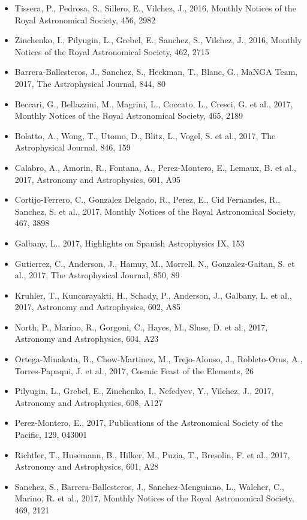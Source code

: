 \documentclass{letter}
\begin{document}
\begin{enumerate}
\begin{itemize}
\item Tissera, P., Pedrosa, S., Sillero, E., Vilchez, J., 2016, Monthly Notices of the Royal Astronomical Society, 456, 2982
\item Zinchenko, I., Pilyugin, L., Grebel, E., Sanchez, S., Vilchez, J., 2016, Monthly Notices of the Royal Astronomical Society, 462, 2715
\item Barrera-Ballesteros, J., Sanchez, S., Heckman, T., Blanc, G., MaNGA Team, 2017, The Astrophysical Journal, 844, 80
\item Beccari, G., Bellazzini, M., Magrini, L., Coccato, L., Cresci, G. et al., 2017, Monthly Notices of the Royal Astronomical Society, 465, 2189
\item Bolatto, A., Wong, T., Utomo, D., Blitz, L., Vogel, S. et al., 2017, The Astrophysical Journal, 846, 159
\item Calabro, A., Amorin, R., Fontana, A., Perez-Montero, E., Lemaux, B. et al., 2017, Astronomy and Astrophysics, 601, A95
\item Cortijo-Ferrero, C., Gonzalez Delgado, R., Perez, E., Cid Fernandes, R., Sanchez, S. et al., 2017, Monthly Notices of the Royal Astronomical Society, 467, 3898
\item Galbany, L., 2017, Highlights on Spanish Astrophysics IX, 153
\item Gutierrez, C., Anderson, J., Hamuy, M., Morrell, N., Gonzalez-Gaitan, S. et al., 2017, The Astrophysical Journal, 850, 89
\item Kruhler, T., Kuncarayakti, H., Schady, P., Anderson, J., Galbany, L. et al., 2017, Astronomy and Astrophysics, 602, A85
\item North, P., Marino, R., Gorgoni, C., Hayes, M., Sluse, D. et al., 2017, Astronomy and Astrophysics, 604, A23
\item Ortega-Minakata, R., Chow-Martinez, M., Trejo-Alonso, J., Robleto-Orus, A., Torres-Papaqui, J. et al., 2017, Cosmic Feast of the Elements, 26
\item Pilyugin, L., Grebel, E., Zinchenko, I., Nefedyev, Y., Vilchez, J., 2017, Astronomy and Astrophysics, 608, A127
\item Perez-Montero, E., 2017, Publications of the Astronomical Society of the Pacific, 129, 043001
\item Richtler, T., Husemann, B., Hilker, M., Puzia, T., Bresolin, F. et al., 2017, Astronomy and Astrophysics, 601, A28
\item Sanchez, S., Barrera-Ballesteros, J., Sanchez-Menguiano, L., Walcher, C., Marino, R. et al., 2017, Monthly Notices of the Royal Astronomical Society, 469, 2121

\end{itemize}
\end{enumerate}
\end{document}
